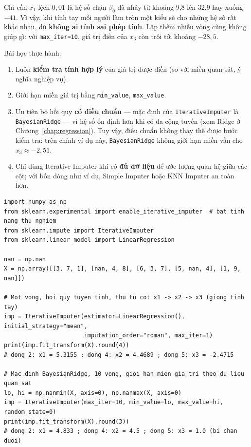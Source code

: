 Chỉ cần $x_1$ lệch $0{,}01$ là hệ số chặn $\beta_0$ đã nhảy từ khoảng 9,8 lên 32,9 hay xuống $-41$. Vì vậy, khi tính tay mỗi người làm tròn một kiểu sẽ cho những hệ số rất khác nhau, dù \textbf{không ai tính sai phép tính}. Lặp thêm nhiều vòng cũng không giúp gì: với \texttt{max\_iter=10}, giá trị điền của $x_3$ còn trôi tới khoảng $-28{,}5$.

Bài học thực hành:
\begin{enumerate}
    \item Luôn \textbf{kiểm tra tính hợp lý} của giá trị được điền (so với miền quan sát, ý nghĩa nghiệp vụ).
    \item Giới hạn miền giá trị bằng \texttt{min\_value}, \texttt{max\_value}.
    \item Ưu tiên bộ hồi quy \textbf{có điều chuẩn} --- mặc định của \texttt{IterativeImputer} là \texttt{BayesianRidge} --- vì hệ số ổn định hơn khi có đa cộng tuyến (xem Ridge ở Chương~\ref{chap:regression}). Tuy vậy, điều chuẩn không thay thế được bước kiểm tra: trên chính ví dụ này, \texttt{BayesianRidge} không giới hạn miền vẫn cho $x_3 \approx -2{,}51$.
    \item Chỉ dùng Iterative Imputer khi có \textbf{đủ dữ liệu} để ước lượng quan hệ giữa các cột; với bốn dòng như ví dụ, Simple Imputer hoặc KNN Imputer an toàn hơn.
\end{enumerate}

\begin{lstlisting}[caption={IterativeImputer tái hiện ví dụ tính tay}]
import numpy as np
from sklearn.experimental import enable_iterative_imputer  # bat tinh nang thu nghiem
from sklearn.impute import IterativeImputer
from sklearn.linear_model import LinearRegression

nan = np.nan
X = np.array([[3, 7, 1], [nan, 4, 8], [6, 3, 7], [5, nan, 4], [1, 9, nan]])

# Mot vong, hoi quy tuyen tinh, thu tu cot x1 -> x2 -> x3 (giong tinh tay)
imp = IterativeImputer(estimator=LinearRegression(), initial_strategy="mean",
                       imputation_order="roman", max_iter=1)
print(imp.fit_transform(X).round(4))
# dong 2: x1 = 5.3155 ; dong 4: x2 = 4.4689 ; dong 5: x3 = -2.4715

# Mac dinh BayesianRidge, 10 vong, gioi han mien gia tri theo du lieu quan sat
lo, hi = np.nanmin(X, axis=0), np.nanmax(X, axis=0)
imp = IterativeImputer(max_iter=10, min_value=lo, max_value=hi, random_state=0)
print(imp.fit_transform(X).round(3))
# dong 2: x1 = 4.833 ; dong 4: x2 = 4.5 ; dong 5: x3 = 1.0 (bi chan duoi)
\end{lstlisting}

